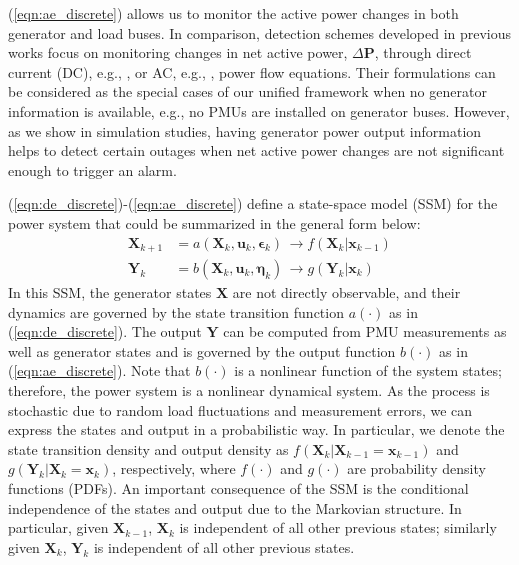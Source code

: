 (\ref{eqn:ae_discrete}) allows us to monitor the active power changes in both generator and load buses. In comparison, detection schemes developed in previous works focus on monitoring changes in net active power, $\Delta\boldsymbol{P}$, through direct current (DC), e.g., \cite{Chen2016}, or AC, e.g., \cite{yang2020control}, power flow equations. Their formulations can be considered as the special cases of our unified framework when no generator information is available, e.g., no PMUs are installed on generator buses. However, as we show in simulation studies, having generator power output information helps to detect certain outages when net active power changes are not significant enough to trigger an alarm.

(\ref{eqn:de_discrete})-(\ref{eqn:ae_discrete}) define a state-space model (SSM) for the power system that could be summarized in the general form below:
\begin{subequations}
\label{eqn:general_ssm}
\begin{align}
\boldsymbol{X}_{k+1} &= a(\boldsymbol{X}_{k}, \boldsymbol{u}_{k}, \boldsymbol{\epsilon}_{k}) \, \rightarrow f(\boldsymbol{X}_{k}|\boldsymbol{x}_{k-1}) \\ 
\boldsymbol{Y}_{k} &= b(\boldsymbol{X}_{k}, \boldsymbol{u}_{k}, \boldsymbol{\eta}_{k}) \, \rightarrow g(\boldsymbol{Y}_{k} | \boldsymbol{x}_{k})
\end{align}
\end{subequations}
In this SSM, the generator states $\boldsymbol{X}$ are not directly observable, and their dynamics are governed by the state transition function $a(\cdot)$ as in (\ref{eqn:de_discrete}). The output $\boldsymbol{Y}$ can be computed from PMU measurements as well as generator states and is governed by the output function $b(\cdot)$ as in (\ref{eqn:ae_discrete}). Note that $b(\cdot)$ is a nonlinear function of the system states; therefore, the power system is a nonlinear dynamical system. As the process is stochastic due to random load fluctuations and measurement errors, we can express the states and output in a probabilistic way. In particular, we denote the state transition density and output density as $f(\boldsymbol{X}_{k}|\boldsymbol{X}_{k-1}=\boldsymbol{x}_{k-1})$ and $g(\boldsymbol{Y}_{k} |\boldsymbol{X}_{k}=\boldsymbol{x}_{k})$, respectively, where $f(\cdot)$ and $g(\cdot)$ are probability density functions (PDFs). An important consequence of the SSM is the conditional independence of the states and output due to the Markovian structure. In particular, given $\boldsymbol{X}_{k-1}$, $\boldsymbol{X}_k$ is independent of all other previous states; similarly given $\boldsymbol{X}_{k}$, $\boldsymbol{Y}_{k}$ is independent of all other previous states.


